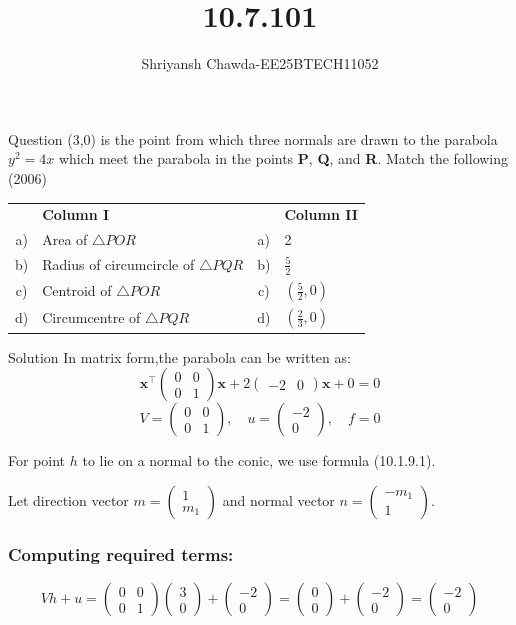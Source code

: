 \documentclass{beamer}
\title{10.7.101}
\author{Shriyansh Chawda-EE25BTECH11052}
\newcommand{\myvec}[1]{\ensuremath{\begin{pmatrix}#1\end{pmatrix}}}
\begin{document}
	

		\frame{\titlepage}
	
	
	

	\begin{frame}{Question} 
(3,0) is the point from which three normals are drawn to the parabola \( y^2 = 4x \) which meet the parabola in the points \textbf{P}, \textbf{Q}, and \textbf{R}. Match the following \hfill (2006)

\begin{center}
	\begin{tabular}{c l c l}
		\hline
		& \textbf{Column I}  & &\textbf{Column II}  \\
		
		a) & Area of \( \triangle POR \) & a) & 2 \\
		b) & Radius of circumcircle of \( \triangle PQR \) & b) & \( \frac{5}{2} \) \\
		c) & Centroid of \( \triangle POR \) & c) & \( \left( \frac{5}{2}, 0 \right) \) \\
		d) & Circumcentre of \( \triangle PQR \) & d) & \( \left( \frac{2}{3}, 0 \right) \) \\
		\hline
	\end{tabular}
\end{center}

\end{frame}
	
\begin{frame}{Solution}
In matrix form,the parabola can be written as:
\begin{equation}
	\mathbf{x}^\top\myvec{0 & 0\\0 & 1}\mathbf{x} + 2\myvec{-2 & 0}\mathbf{x} + 0 = 0
\end{equation}
\begin{equation}
	V = \myvec{0 & 0\\0 & 1}, \quad u = \myvec{-2\\0}, \quad f = 0
\end{equation}

For point $h$ to lie on a normal to the conic, we use formula (10.1.9.1).

Let direction vector $m = \myvec{1\\m_1}$ and normal vector $n = \myvec{-m_1\\1}$.

\subsubsection*{Computing required terms:}

\begin{equation}
	Vh + u = \myvec{0 & 0\\0 & 1}\myvec{3\\0} + \myvec{-2\\0} = \myvec{0\\0} + \myvec{-2\\0} = \myvec{-2\\0}
\end{equation}
\end{frame}
\end{document}
